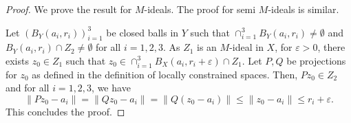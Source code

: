\documentclass[10pt,a4paper]{amsart}
\newcommand{\e}{\varepsilon}
\newcommand{\es}{\emptyset}
\begin{document}
\begin{proof}
We prove the result for $M$-ideals. The proof for semi $M$-ideals is similar.

Let $(B_Y(a_i,r_i))_{i=1}^3$ be closed balls in $Y$ such that $\cap_{i=1}^3B_Y(a_i,r_i)\neq\es$ and $B_{Y}(a_i,r_i)\cap {Z_2}\neq\es$ for all $i=1,2,3$. As $Z_1$ is an $M$-ideal in $X$, for $\e>0$, there exists $z_0\in Z_1$ such that $z_0\in\cap_{i=1}^3B_X(a_i,r_i+\e)\cap Z_1$. Let $P,Q$ be projections for $z_0$ as defined in the definition of locally constrained spaces. Then, $Pz_0\in Z_2$ and for all $i=1,2,3$, we have
\[
\|Pz_0-a_i\|=\|Qz_0-a_i\|=\|Q(z_0-a_i)\|\leq\|z_0-a_i\|\leq r_i+\e.
\]
This concludes the proof.
\end{proof}
\end{document}
